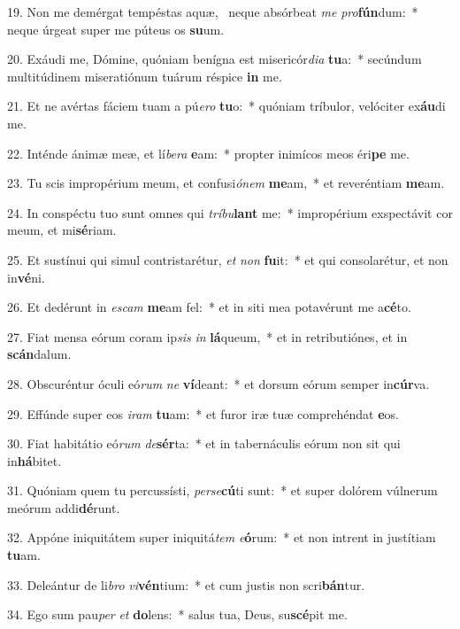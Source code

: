 19. Non me demérgat tempéstas aquæ, \dag\  neque absórbeat \textit{me} \textit{pro}\textbf{fún}dum:~*  neque úrgeat super me púteus os \textbf{su}um.\

20. Exáudi me, Dómine, quóniam benígna est misericór\textit{di}\textit{a} \textbf{tu}a:~*  secúndum multitúdinem miseratiónum tuárum réspice \textbf{in} me.\

21. Et ne avértas fáciem tuam a pú\textit{e}\textit{ro} \textbf{tu}o:~*  quóniam tríbulor, velóciter ex\textbf{áu}di me.\

22. Inténde ánimæ meæ, et lí\textit{be}\textit{ra} \textbf{e}am:~*  propter inimícos meos éri\textbf{pe} me.\

23. Tu scis impropérium meum, et confusi\textit{ó}\textit{nem} \textbf{me}am,~*  et reveréntiam \textbf{me}am.\

24. In conspéctu tuo sunt omnes qui \textit{trí}\textit{bu}\textbf{lant} me:~*  impropérium exspectávit cor meum, et mi\textbf{sé}riam.\

25. Et sustínui qui simul contristarétur, \textit{et} \textit{non} \textbf{fu}it:~*  et qui consolarétur, et non in\textbf{vé}ni.\

26. Et dedérunt in \textit{es}\textit{cam} \textbf{me}am fel:~*  et in siti mea potavérunt me a\textbf{cé}to.\

27. Fiat mensa eórum coram ip\textit{sis} \textit{in} \textbf{lá}queum,~*  et in retributiónes, et in \textbf{scán}dalum.\

28. Obscuréntur óculi eó\textit{rum} \textit{ne} \textbf{ví}deant:~*  et dorsum eórum semper in\textbf{cúr}va.\

29. Effúnde super eos \textit{i}\textit{ram} \textbf{tu}am:~*  et furor iræ tuæ comprehéndat \textbf{e}os.\

30. Fiat habitátio eó\textit{rum} \textit{de}\textbf{sér}ta:~*  et in tabernáculis eórum non sit qui in\textbf{há}bitet.\

31. Quóniam quem tu percussísti, \textit{per}\textit{se}\textbf{cú}ti sunt:~*  et super dolórem vúlnerum meórum addi\textbf{dé}runt.\

32. Appóne iniquitátem super iniquitá\textit{tem} \textit{e}\textbf{ó}rum:~*  et non intrent in justítiam \textbf{tu}am.\

33. Deleántur de li\textit{bro} \textit{vi}\textbf{vén}tium:~*  et cum justis non scri\textbf{bán}tur.\

34. Ego sum pau\textit{per} \textit{et} \textbf{do}lens:~*  salus tua, Deus, su\textbf{scé}pit me.\

